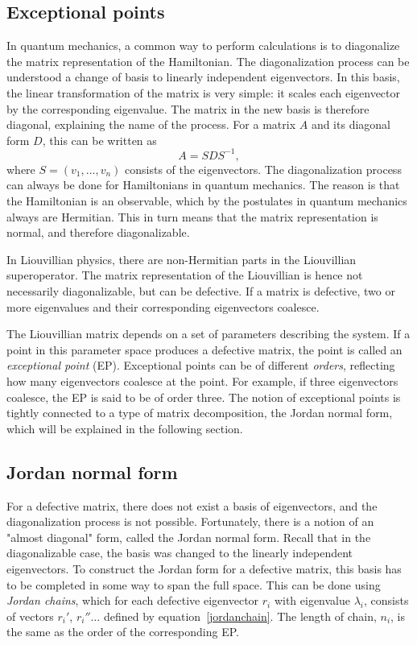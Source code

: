 \documentclass[../main.tex]{subfiles}
\begin{document}
\subsection{Exceptional points}\label{sec:ep}
In quantum mechanics, a common way to perform calculations is to diagonalize the matrix representation of the Hamiltonian. The diagonalization process can be understood a change of basis to linearly independent eigenvectors. In this basis, the linear transformation of the matrix is very simple: it scales each eigenvector by the corresponding eigenvalue. The matrix in the new basis is therefore diagonal, explaining the name of the process. For a matrix $A$ and its diagonal form $D$, this can be written as 
\begin{equation}
    A = SDS^{-1},
\end{equation}
where $S = (v_1, \dots ,v_n)$ consists of the eigenvectors. The diagonalization process can always be done for Hamiltonians in quantum mechanics. The reason is that the Hamiltonian is an observable, which by the postulates in quantum mechanics always are Hermitian. This in turn means that the matrix representation is normal, and therefore diagonalizable.

In Liouvillian physics, there are non-Hermitian parts in the Liouvillian superoperator. The matrix representation of the Liouvillian is hence not necessarily diagonalizable, but can be defective. If a matrix is defective, two or more eigenvalues and their corresponding eigenvectors coalesce.

The Liouvillian matrix depends on a set of parameters describing the system. If a point in this parameter space produces a defective matrix, the point is called an \textit{exceptional point} (EP). Exceptional points can be of different \textit{orders}, reflecting how many eigenvectors coalesce at the point. For example, if three eigenvectors coalesce, the EP is said to be of order three. The notion of exceptional points is tightly connected to a type of matrix decomposition, the Jordan normal form, which will be explained in the following section.

\subsection{Jordan normal form}

For a defective matrix, there does not exist a basis of eigenvectors, and the diagonalization process is not possible. Fortunately, there is a notion of an "almost diagonal" form, called the Jordan normal form. Recall that in the diagonalizable case, the basis was changed to the linearly independent eigenvectors. To construct the Jordan form for a defective matrix, this basis has to be completed in some way to span the full space. This can be done using \textit{Jordan chains}, which for each defective eigenvector $r_i$ with eigenvalue $\lambda_i$, consists of vectors $r_i'$, $r_i'' \dots$ defined by equation~\ref{jordanchain}. The length of chain, $n_i$, is the same as the order of the corresponding EP.
\end{document}
